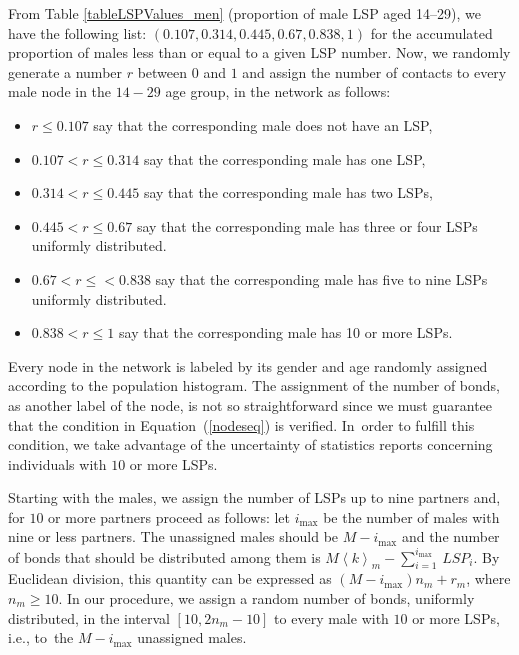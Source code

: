 From Table \ref{tableLSPValues_men} (proportion of male LSP aged 14--29), we have the following list:
$( 0.107, 0.314, 0.445, 0.67, 0.838, 1)$ for the accumulated proportion of males less than or equal to a given LSP number.
Now, we randomly generate a number $r$ between $0$ and $1$ and assign the number of contacts to every male node in the $14-29$
age group, in the network as follows:

\begin{itemize}[leftmargin=*,labelsep=5mm]
\item $r \le 0.107$ say that the corresponding male does not have an LSP,
\item $0.107 < r \le 0.314$ say that the corresponding male has one LSP,
\item $0.314 < r \le 0.445$ say that the corresponding male has two LSPs,
\item $0.445 < r \le 0.67$  say that the corresponding male has three or four LSPs uniformly distributed.
\item $0.67 < r \le < 0.838$ say that the corresponding male has five to nine LSPs uniformly distributed.
\item $0.838 < r \le 1$ say that the corresponding male has 10 or more LSPs.
\end{itemize}

Every node in the network is labeled by its gender and age randomly assigned according to the population histogram. The assignment of the number of bonds, as another label of the node, is not so straightforward since we must guarantee that the condition in Equation\ (\ref{nodeseq}) is verified. In~order to fulfill this condition, we take advantage of the uncertainty of statistics reports concerning individuals with $10$ or more LSPs.

Starting with the males, we assign the number of LSPs up to nine partners and, for $10$ or more partners proceed as follows: let $i_{\mbox{max}}$ be the number of males with nine or less partners. The unassigned males should be $M-i_{\mbox{max}}$ and the number of bonds that should be distributed among them is $M \left\langle k \right\rangle_m-\sum_{i=1}^{i_{\mbox{max}}}\, LSP_i$. By Euclidean division, this quantity can be expressed as $(M-i_{\mbox{max}}) n_m+r_m$, where $n_m \ge 10$. In our procedure, we assign a random number of bonds, uniformly distributed, in the interval $\left[10,2 n_m-10\right]$ to every male with $10$ or more LSPs, i.e.,
to~the $M-i_{\mbox{max}}$ unassigned males.

